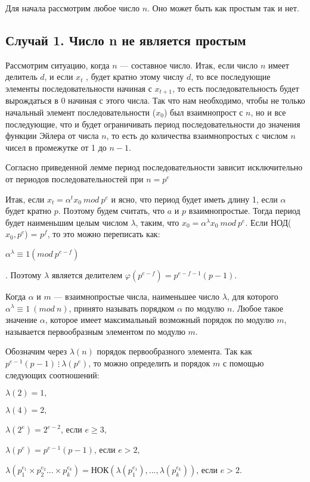 \documentclass[bachelor, och, labwork]{shiza}
\begin{document}
Для начала рассмотрим любое число $n$. Оно может быть как простым так и нет.

\subsection{Случай 1. Число n не является простым}
Рассмотрим ситуацию, когда $n$ --- составное число. Итак, если число $n$ имеет
делитель $d$, и если $x_t$ , будет кратно этому числу $d$, то все последующие
элементы последовательности начиная с $x_{t+1}$, то есть последовательность будет
вырождаться в 0 начиная с этого числа. Так что нам необходимо, чтобы не только
начальный элемент последовательности ($x_0$) был взаимнопрост с $n$, но и все 
последующие, что и будет ограничивать период последовательности до значения
функции Эйлера от числа $n$, то есть до количества взаимнопростых с числом
$n$ чисел в промежутке от 1 до $n-1$.

Согласно приведенной лемме период последовательности зависит исключительно от
периодов последовательностей при $n=p^e$

Итак, если $x_t=\alpha^{t}x_0~mod~p^e$ и ясно, что период будет иметь длину 1,
если $\alpha$ будет кратно $p$. Поэтому будем считать, что $a$ и $p$ взаимнопростые.
Тогда период будет наименьшим целым числом $\lambda$, таким, что $x_0=\alpha^\lambda x_0~mod~p^e$.
Если НОД($x_0,p^e$) = $p^f$, то это можно переписать как:

\begin{center}$\alpha^\lambda \equiv 1 (mod ~p^{e-f})$\end{center}. Поэтому
$\lambda$ является делителем $\varphi(p^{e-f})=p^{e-f-1}(p-1)$.

Когда $\alpha$ и $m$ --- взаимнопростые числа, наименьшее число $\lambda$, для
которого $\alpha^\lambda \equiv 1 ~(mod~n)$, принято называть порядком
$\alpha$ по модулю $n$. Любое такое значение $\alpha$, которое имеет максимальный
возможный порядок по модулю $m$, называется первообразным элементом по модулю $m$.

Обозначим через $\lambda(n)$ порядок первообразного элемента. Так как $p^{e-1}(p-1) ~\vdots~ \lambda(p^e)$,
то можно определить и порядок $m$ с помощью следующих соотношений:

\begin{center}

$\lambda(2) = 1,$

$\lambda(4) = 2,$

$\lambda(2^e)=2^{e-2}$, если $e \geq 3,$

$\lambda(p^e)=p^{e-1} (p-1)$, если $e > 2,$

$\lambda(p_1^{e_1} \times p_2^{e_2}...\times p_k^{e_k})= \text{НОК}(\lambda(p_1^{e_1}),...,\lambda(p_k^{e_k}))$, если $e > 2$.
\end{center}
\end{document}
